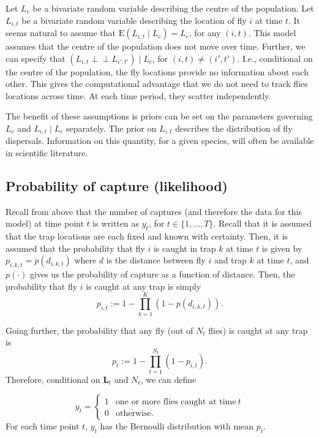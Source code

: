 \documentclass[
  oneside]{book}
\begin{document}
Let \(L_c\) be a bivariate random variable describing the centre of the population. Let \(L_{i, t}\) be a bivariate random variable describing the location of fly \(i\) at time \(t\). It seems natural to assume that \(\mathrm E (L_{i, t} \mid L_c) = L_c\), for any \((i, t)\). This model assumes that the centre of the population does not move over time. Further, we can specify that \((L_{i, t} \perp \!\!\! \perp L_{i', t'}) \mid L_c\), for \((i, t) \neq (i', t')\). I.e., conditional on the centre of the population, the fly locations provide no information about each other. This gives the computational advantage that we do not need to track flies locations across time. At each time period, they scatter independently.

The benefit of these assumptions is priors can be set on the parameters governing \(L_c\) and \(L_{i, t} \mid L_c\) separately. The prior on \(L_{i, t}\) describes the distribution of fly dispersals. Information on this quantity, for a given species, will often be available in scientific literature.

\hypertarget{probability-of-capture-likelihood}{%
\subsection{Probability of capture (likelihood)}\label{probability-of-capture-likelihood}}

Recall from above that the number of captures (and therefore the data for this model) at time point \(t\) is written as \(y_t\), for \(t \in \{1, \ldots, T\}\). Recall that it is assumed that the trap locations are each fixed and known with certainty. Then, it is assumed that the probability that fly \(i\) is caught in trap \(k\) at time \(t\) is given by \(p_{i, k, t} = p(d_{i, k, t})\) where \(d\) is the distance between fly \(i\) and trap \(k\) at time \(t\), and \(p(\cdot)\) gives us the probability of capture as a function of distance. Then, the probability that fly \(i\) is caught at any trap is simply
\[
p_{i, t} := 1 - \prod_{k=1}^K(1 - p(d_{i, k, t})).
\]

Going further, the probability that any fly (out of \(N_t\) flies) is caught at any trap is
\[
p_t := 1 - \prod_{t=1}^{N_t} (1 - p_{i,t}).
\]
Therefore, conditional on \(\mathbf L_t\) and \(N_t\), we can define

\[
y_t = \begin{cases} 1 & \text{one or more flies caught at time} ~t \\ 0 & \text{otherwise.} \end{cases}
\]
For each time point \(t\), \(y_t\) has the Bernoulli distribution with mean \(p_t\).
\end{document}
